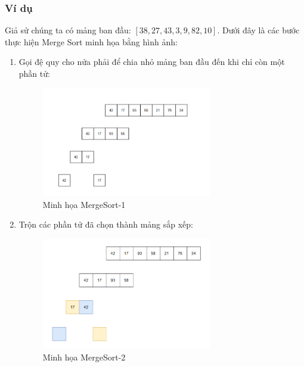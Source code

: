 \subsubsection{Ví dụ}

Giả sử chúng ta có mảng ban đầu: $[38, 27, 43, 3, 9, 82, 10]$. Dưới đây là các bước thực hiện Merge Sort minh họa bằng hình ảnh:

\begin{enumerate}
    \item Gọi đệ quy cho nửa phải để chia nhỏ mảng ban đầu đến khi chỉ còn một phần tử:
    \begin{figure}[H]
        \centering
        \includegraphics[width=0.7\textwidth]{img/merge_sort/1.png}
        \caption{Minh họa MergeSort-1}
    \end{figure}
    
    \item Trộn các phần tử đã chọn thành mảng sắp xếp:
    \begin{figure}[H]
        \centering
        \includegraphics[width=0.7\textwidth]{img/merge_sort/2.png}
        \caption{Minh họa MergeSort-2}
    \end{figure}
    

\end{enumerate}
